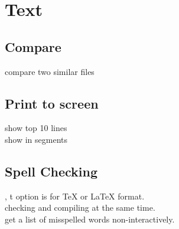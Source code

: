 \chapter{Text}


\section{Compare}

 compare two similar files\\


\section{Print to screen}

 show top 10 lines\\
 show in segments


\section{Spell Checking}
 , t option is for \TeX{} or \LaTeX{} format.\\
 checking and compiling at the same time.\\
 get a list of misspelled words non-interactively.

